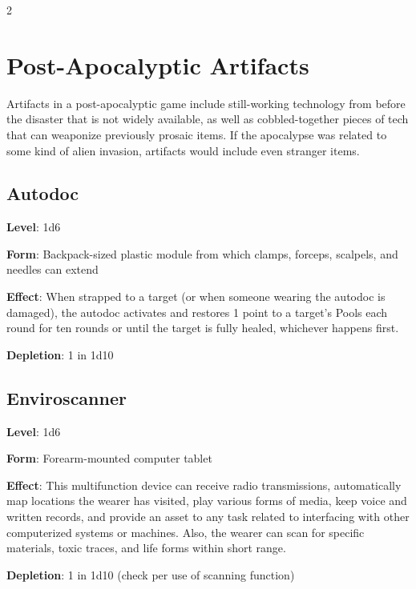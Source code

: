 \begin{multicols}{2}

\chapter{Post-Apocalyptic Artifacts}

Artifacts in a post-apocalyptic game include still-working technology from before the disaster that is not widely available, as well as cobbled-together pieces of tech that can weaponize previously prosaic items. If the apocalypse was related to some kind of alien invasion, artifacts would include even stranger items.

\section{Autodoc}

\textbf{Level}: 1d6

\textbf{Form}: Backpack-sized plastic module from which clamps, forceps, scalpels, and needles can extend

\textbf{Effect}: When strapped to a target (or when someone wearing the autodoc is damaged), the autodoc activates and restores 1 point to a target’s Pools each round for ten rounds or until the target is fully healed, whichever happens first.

\textbf{Depletion}: 1 in 1d10

\section{Enviroscanner}

\textbf{Level}: 1d6

\textbf{Form}: Forearm-mounted computer tablet

\textbf{Effect}: This multifunction device can receive radio transmissions, automatically map locations the wearer has visited, play various forms of media, keep voice and written records, and provide an asset to any task related to interfacing with other computerized systems or machines. Also, the wearer can scan for specific materials, toxic traces, and life forms within short range.

\textbf{Depletion}: 1 in 1d10 (check per use of scanning function)


\end{multicols}
